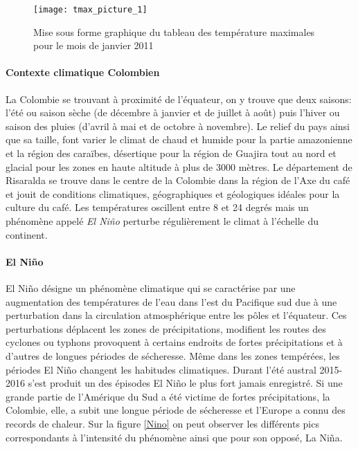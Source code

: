 \begin{figure}[H]
	\texttt{[image: tmax\_picture\_1]}
	\caption{\label{tmax_picture} Mise sous forme graphique du tableau des température maximales pour le mois de janvier 2011 }
\end{figure}

\paragraph{Contexte climatique Colombien}La Colombie se trouvant à proximité de l'équateur, on y trouve que deux saisons: l'été ou saison sèche (de décembre à janvier et de juillet à août) puis l'hiver ou saison des pluies (d'avril à mai et de octobre à novembre). Le relief du pays ainsi que sa taille, font varier le climat de chaud et humide pour la partie amazonienne et la région des caraïbes, désertique pour la région de Guajira tout au nord et glacial pour les zones en haute altitude à plus de 3000 mètres. Le département de Risaralda se trouve dans le centre de la Colombie dans la région de l'Axe du café et jouit de conditions climatiques, géographiques et géologiques idéales pour la culture du café. Les températures oscillent entre 8 et 24 degrés mais un phénomène appelé \textit{El Niño} perturbe régulièrement le climat à l'échelle du continent. 




\paragraph{El Niño}El Niño désigne un phénomène climatique qui se caractérise par une augmentation des températures de l'eau dans l'est du Pacifique sud due à une perturbation dans la circulation atmosphérique entre les pôles et l'équateur. Ces perturbations déplacent les zones de précipitations, modifient les routes des cyclones ou typhons provoquent à certains endroits de fortes précipitations et à d'autres de longues périodes de sécheresse. Même dans les zones tempérées, les périodes El Niño changent les habitudes climatiques. Durant l'été austral 2015-2016 s'est produit un des épisodes El Niño le plus fort jamais enregistré\cite{OMM}. Si une grande partie de l'Amérique du Sud a été victime de fortes précipitations, la Colombie, elle, a subit une longue période de sécheresse et l'Europe a connu des records de chaleur. Sur la figure \ref{Nino} on peut observer les différents pics correspondants à l'intensité du phénomène ainsi que pour son opposé, La Niña. 

